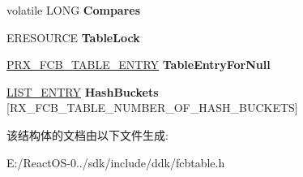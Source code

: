 \begin{DoxyCompactItemize}
\mbox{\label{struct___r_x___f_c_b___t_a_b_l_e_a6a353569670bf921d909a802a1616e50}} 
volatile L\+O\+NG {\bfseries Compares}
\item 
\mbox{\label{struct___r_x___f_c_b___t_a_b_l_e_a9c9249bd71c914fa89aa58df64966cdc}} 
E\+R\+E\+S\+O\+U\+R\+CE {\bfseries Table\+Lock}
\item 
\mbox{\label{struct___r_x___f_c_b___t_a_b_l_e_a25583fd82674175372ff8044fe40ad98}} 
\hyperlink{struct___r_x___f_c_b___t_a_b_l_e___e_n_t_r_y}{P\+R\+X\+\_\+\+F\+C\+B\+\_\+\+T\+A\+B\+L\+E\+\_\+\+E\+N\+T\+RY} {\bfseries Table\+Entry\+For\+Null}
\item 
\mbox{\label{struct___r_x___f_c_b___t_a_b_l_e_a2bc6e697d1edcf1cea5e992afeca5b1a}} 
\hyperlink{struct___l_i_s_t___e_n_t_r_y}{L\+I\+S\+T\+\_\+\+E\+N\+T\+RY} {\bfseries Hash\+Buckets} \mbox{[}R\+X\+\_\+\+F\+C\+B\+\_\+\+T\+A\+B\+L\+E\+\_\+\+N\+U\+M\+B\+E\+R\+\_\+\+O\+F\+\_\+\+H\+A\+S\+H\+\_\+\+B\+U\+C\+K\+E\+TS\mbox{]}
\end{DoxyCompactItemize}


该结构体的文档由以下文件生成\+:\begin{DoxyCompactItemize}
\item 
E\+:/\+React\+O\+S-\/0../sdk/include/ddk/fcbtable.\+h\end{DoxyCompactItemize}
